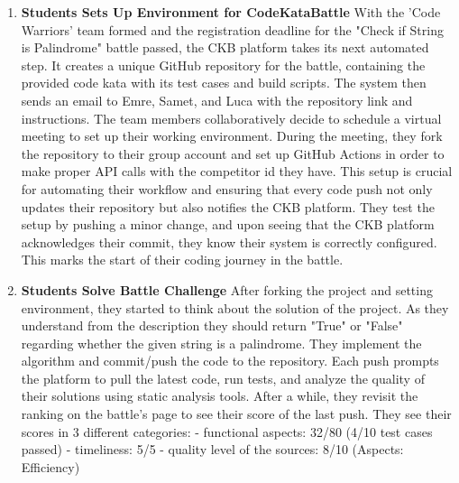 \begin{enumerate}
    \item \textbf{Students Sets Up Environment for CodeKataBattle} \newline With the 'Code Warriors' team formed and the registration deadline for the "Check if String is Palindrome" battle passed, the CKB platform takes its next automated step. It creates a unique GitHub repository for the battle, containing the provided code kata with its test cases and build scripts. The system then sends an email to Emre, Samet, and Luca with the repository link and instructions. The team members collaboratively decide to schedule a virtual meeting to set up their working environment. During the meeting, they fork the repository to their group account and set up GitHub Actions in order to make proper API calls with the competitor id they have. This setup is crucial for automating their workflow and ensuring that every code push not only updates their repository but also notifies the CKB platform. They test the setup by pushing a minor change, and upon seeing that the CKB platform acknowledges their commit, they know their system is correctly configured. This marks the start of their coding journey in the battle.
    \item \textbf{Students Solve Battle Challenge} \newline After forking the project and setting environment, they started to think about the solution of the project. As they understand from the description they should return "True" or "False" regarding whether the given string is a palindrome. They implement the algorithm and commit/push the code to the repository. Each push prompts the platform to pull the latest code, run tests, and analyze the quality of their solutions using static analysis tools. After a while, they revisit the ranking on the battle's page to see their score of the last push. They see their scores in 3 different categories: \newline
    - functional aspects: 32/80 (4/10 test cases passed) \newline
    - timeliness: 5/5 \newline
    - quality level of the sources: 8/10 (Aspects: Efficiency) \newline

\end{enumerate}

